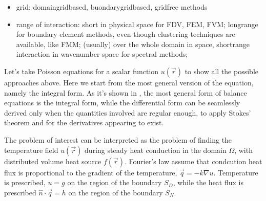 \documentclass[letterpaper,10pt,english]{jupyterBook}
\begin{document}
\sphinxAtStartPar
{}
\begin{itemize}
\item {} 
\sphinxAtStartPar
grid: domain\sphinxhyphen{}grid\sphinxhyphen{}based, buondary\sphinxhyphen{}grid\sphinxhyphen{}based, grid\sphinxhyphen{}free methods

\item {} 
\sphinxAtStartPar
range of interaction: short in physical space for FDV, FEM, FVM; long\sphinxhyphen{}range for boundary element methods, even though clustering techniques are available, like FMM; (usually) over the whole domain in space, short\sphinxhyphen{}range interaction in wave\sphinxhyphen{}number space for spectral methods;

\end{itemize}

\sphinxAtStartPar
{} 

\sphinxAtStartPar
Let’s take Poisson equations for a scalar function \(u(\vec{r})\) to show all the possible approaches above. Here we start from the most general version of the equation, namely the integral form. As it’s shown in , the most general form of balance equations is the integral form, while the differential form can be seamlessly derived only when the quantities involved are regular enough, to apply Stokes’ theorem and for the derivatives appearing to exist.

\sphinxAtStartPar
The problem of interest can be interpreted as the problem of finding the temperature field \(u(\vec{r})\) during steady heat conduction in the domain \(\Omega\), with distributed volume heat source \(f(\vec{r})\). Fourier’s law assume that condcution heat flux is proportional to the gradient of the temperature, \(\vec{q} = - k \nabla u\). Temperature is prescribed, \(u = g\) on the region of the boundary \(S_D\), while the heat flux is prescribed  \(\hat{n} \cdot \vec{q} = h\) on the region of the boundary \(S_N\).
\end{document}
